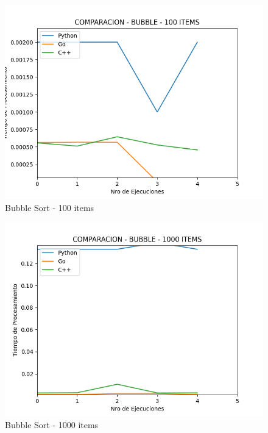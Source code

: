 \documentclass[12pt]{article} %
\begin{document}
\begin{figure}[H]
    \centering
    \includegraphics[width=\textwidth]{bubble_100}
    \caption{Bubble Sort - 100 items}
    \end{figure}
    
    \vspace{5mm}
    
    \begin{figure}[H]
    \centering
    \includegraphics[width=\textwidth]{bubble_1000}
    \caption{Bubble Sort - 1000 items}
    \end{figure}
    
    \vspace{5mm}
    
\end{document}
